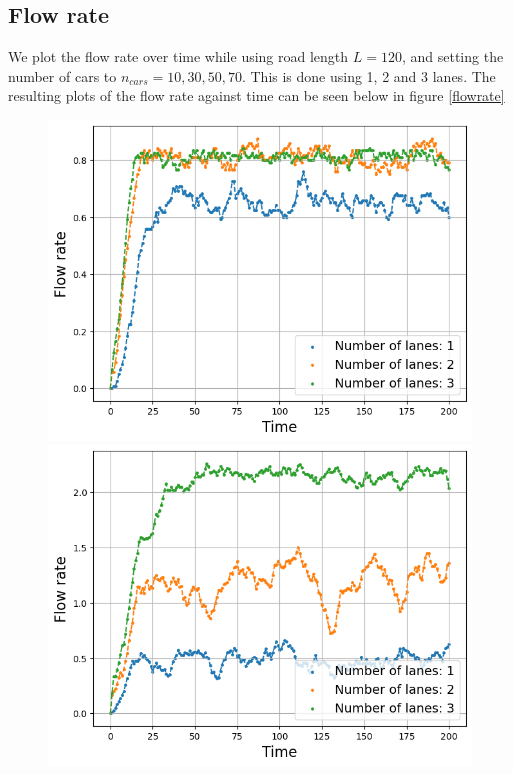 \documentclass[a4paper,12pt]{article}
\begin{document}
\subsection*{Flow rate}
We plot the flow rate over time while using road length $L=120$, and setting the number of cars to $n_{cars}=10, 30, 50, 70$. This is done using 1, 2 and 3 lanes.
The resulting plots of the flow rate against time can be seen below in figure \ref*{flowrate}
\begin{figure}[H]
    \centering
    \begin{minipage}{.5\textwidth}
        \centering
        \includegraphics[scale=0.47]{Images/flowrate time 10 cars.png}
    \end{minipage}%
    \begin{minipage}{.5\textwidth}
        \centering
        \includegraphics[scale=0.47]{Images/flowrate time 30 cars.png}

\end{minipage}
\end{figure}
\end{document}
